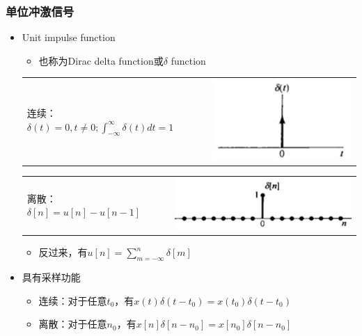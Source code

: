 \documentclass[CJKutf8,xcolor=pdftex,dvipsnames,table]{beamer}
\begin{document}
\begin{CJK*}{UTF8}{song}
\begin{frame}
\begin{itemize}
    \end{itemize}
  \end{frame}  

  \begin{frame}
    \frametitle{单位冲激信号}
    \begin{itemize}
    \item Unit impulse function
    \begin{itemize}
    \item 也称为Dirac delta function或$\delta$ function
    \end{itemize}  
     
	\begin{tabular}{ll}
	\raisebox{-.5\height}

    连续：
    \begin{math}
	\delta(t) = 0, t \neq 0; \int_{-\infty}^{\infty}\delta(t)dt=1 
	\end{math}

&
    \includegraphics[valign=m,scale=.4]{cdelta}    \\
    \end{tabular}   

	\begin{tabular}{ll}
	\raisebox{-.5\height}

    离散：$\delta[n]=u[n]-u[n-1]$	

&
    \includegraphics[valign=m,scale=.4]{ddelta}    \\
    \end{tabular}   
    
    \begin{itemize}
    \item 反过来，有$u[n]=\sum_{m=-\infty}^{n}\delta[m]$   
    \end{itemize}
    
	\item 具有采样功能
	\begin{itemize}
	\item 连续：对于任意$t_0$，有$x(t)\delta(t-t_0)=x(t_0)\delta(t-t_0)$
	\item 离散：对于任意$n_0$，有$x[n]\delta[n-n_0]=x[n_0]\delta[n-n_0]$
	\end{itemize}
    \end{itemize}
  \end{frame}


\end{CJK*}
\end{document}
